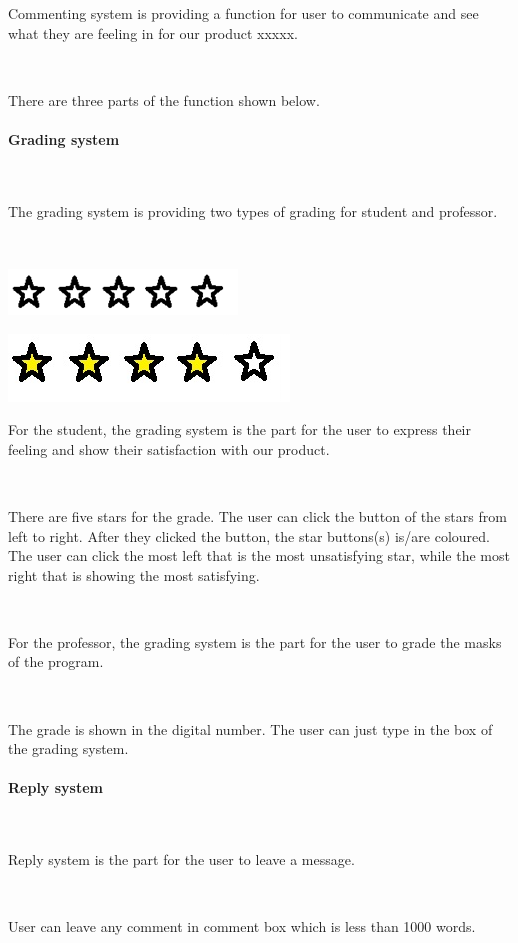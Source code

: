 Commenting system is providing a function for user to communicate and see what they are feeling in for our product xxxxx.\par~

There are three parts of the function shown below.

\paragraph{Grading system}~

The grading system is providing two types of grading for student and professor.\par~

\includegraphics[scale=0.7]{Doc/Graphics/0star}

\includegraphics[scale=0.56]{Doc/Graphics/4star}

For the student, the grading system is the part for the user to express their feeling and show their satisfaction with our product.\par~

There are five stars for the grade. The user can click the button of the stars from left to right. After they clicked the button, the star buttons(s) is/are coloured. The user can click the most left that is the most unsatisfying star, while the most right that is showing the most satisfying.\par~

For the professor, the grading system is the part for the user to grade the masks of the program.\par~

The grade is shown in the digital number. The user can just type in the box of the grading system.

\paragraph{Reply system}~

Reply system is the part for the user to leave a message.\par~

User can leave any comment in comment box which is less than 1000 words.\par~

